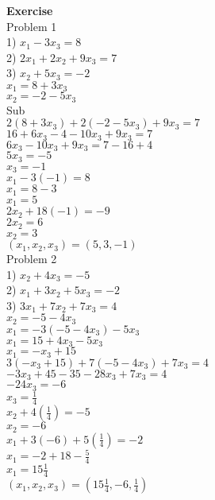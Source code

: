 \documentclass[]{article}
\begin{document}
\textbf{Exercise}\\
\textsf{Problem 1}\\
1) $x_1 - 3x_3 = 8$\\
2) $2x_1 + 2x_2 + 9x_3 = 7$\\
3) $x_2 + 5x_3 = -2$\\
$x_1 = 8 + 3x_3$\\
$x_2 = -2 - 5x_3$\\
Sub\\
$2(8 + 3x_3) + 2(-2 - 5x_3) + 9x_3 = 7$\\
$16 + 6x_3 -4 -10x_3 + 9x_3 = 7$\\
$6x_3 - 10x_3 + 9x_3 = 7 - 16 + 4$\\
$5x_3 = -5$\\
$x_3 = -1$\\
$x_1 - 3(-1) = 8$\\
$x_1 = 8 - 3$\\
$x_1 = 5$\\
$2x_2 + 18(-1) = -9$\\
$2x_2 = 6$\\
$x_2 = 3$\\
$(x_1, x_2, x_3) = (5, 3, -1)$\\
\textsf{Problem 2}\\
1) $x_2 + 4x_3 = -5$\\
2) $x_1 + 3x_2 + 5x_3 = -2$\\
3) $3x_1 + 7x_2 + 7x_3 = 4$\\
$x_2 = -5 - 4x_3$\\
$x_1 = -3(-5 - 4x_3) - 5x_3$\\
$x_1 = 15 + 4x_3 - 5x_3$\\
$x_1 = -x_3 + 15$\\
$3(-x_3 + 15) + 7(-5 - 4x_3) + 7x_3 = 4$\\
$-3x_3 + 45 - 35 - 28x_3 + 7x_3 = 4$\\
$-24x_3 = -6$\\
$x_3 = \frac{1}{4}$\\
$x_2 + 4(\frac{1}{4}) = -5$\\
$x_2 = -6$\\
$x_1 + 3(-6) + 5(\frac{1}{4}) = -2$\\
$x_1 = -2 + 18 - \frac{5}{4}$\\
$x_1 = 15\frac{1}{4}$\\
$(x_1, x_2, x_3) = (15\frac{1}{4}, -6, \frac{1}{4})$\\
\end{document}
